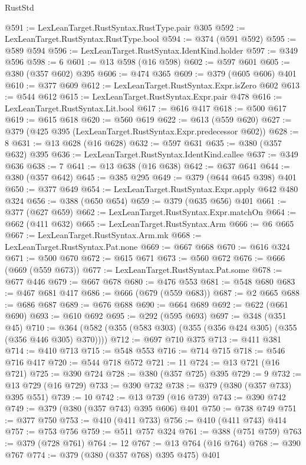 \begin{lexlean}{RustStd}
\begin{coremodule}
@591 := LexLeanTarget.RustSyntax.RustType.pair @305
@592 := LexLeanTarget.RustSyntax.RustType.bool
@594 := @374 (@591 @592)
@595 := @589 @594
@596 := LexLeanTarget.RustSyntax.IdentKind.holder
@597 := @349 @596
@598 := 6
@601 := @13 @598 (@16 @598)
@602 := @597 @601
@605 := @380 (@357 @602) @395
@606 := @474 @365
@609 := @379 (@605 @606) @401
@610 := @377 @609
@612 := LexLeanTarget.RustSyntax.Expr.isZero @602
@613 := @544 @612
@615 := LexLeanTarget.RustSyntax.Expr.pair @478
@616 := LexLeanTarget.RustSyntax.Lit.bool
@617 := @616 @417
@618 := @500 @617
@619 := @615 @618
@620 := @560 @619
@622 := @613 (@559 @620)
@627 := @379 (@425 @395 (LexLeanTarget.RustSyntax.Expr.predecessor @602))
@628 := 8
@631 := @13 @628 (@16 @628)
@632 := @597 @631
@635 := @380 (@357 @632) @395
@636 := LexLeanTarget.RustSyntax.IdentKind.callee
@637 := @349 @636
@638 := 7
@641 := @13 @638 (@16 @638)
@642 := @637 @641
@644 := @380 (@357 @642)
@645 := @385 @295
@649 := @379 (@644 @645 @398) @401
@650 := @377 @649
@654 := LexLeanTarget.RustSyntax.Expr.apply @642 @480 @324
@656 := @388 (@650 @654)
@659 := @379 (@635 @656) @401
@661 := @377 (@627 @659)
@662 := LexLeanTarget.RustSyntax.Expr.matchOn
@664 := @662 (@411 @632)
@665 := LexLeanTarget.RustSyntax.Arm
@666 := @6 @665
@667 := LexLeanTarget.RustSyntax.Arm.mk
@668 := LexLeanTarget.RustSyntax.Pat.none
@669 := @667 @668
@670 := @616 @324
@671 := @500 @670
@672 := @615 @671
@673 := @560 @672
@676 := @666 (@669 (@559 @673))
@677 := LexLeanTarget.RustSyntax.Pat.some
@678 := @677 @446
@679 := @667 @678
@680 := @476 @553
@681 := @548 @680
@683 := @467 @681 @417
@686 := @666 (@679 (@559 @683))
@687 := @2 @665
@688 := @686 @687
@689 := @676 @688
@690 := @664 @689
@692 := @622 (@661 @690)
@693 := @610 @692
@695 := @292 (@595 @693)
@697 := @348 (@351 @45)
@710 := @364 (@582 (@355 (@583 @303) (@355 (@356 @424 @305) (@355 (@356 @446 @305) @370))))
@712 := @697 @710 @375
@713 := @411 @381
@714 := @410 @713
@715 := @548 @553
@716 := @714 @715
@718 := @546 @716 @417
@720 := @544 @718 @572
@721 := 11
@724 := @13 @721 (@16 @721)
@725 := @390 @724
@728 := @380 (@357 @725) @395
@729 := 9
@732 := @13 @729 (@16 @729)
@733 := @390 @732
@738 := @379 (@380 (@357 @733) @395 @551)
@739 := 10
@742 := @13 @739 (@16 @739)
@743 := @390 @742
@749 := @379 (@380 (@357 @743) @395 @606) @401
@750 := @738 @749
@751 := @377 @750
@753 := @410 (@411 @733)
@756 := @410 (@411 @743) @414
@757 := @753 @756
@759 := @511 @757 @324
@761 := @388 (@751 @759)
@763 := @379 (@728 @761)
@764 := 12
@767 := @13 @764 (@16 @764)
@768 := @390 @767
@774 := @379 (@380 (@357 @768) @395 @475) @401

\end{coremodule}
\end{lexlean}
